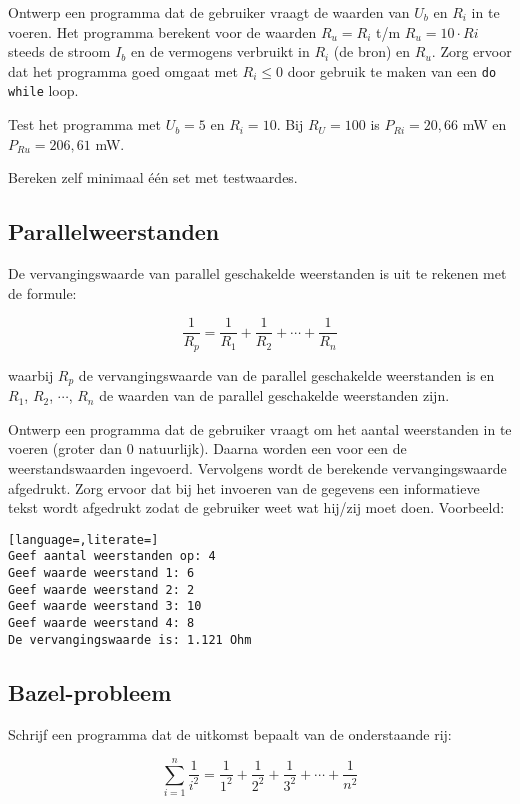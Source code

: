 \documentclass[a4paper,10pt,fleqn,twoside]{article}
\begin{document}
Ontwerp een programma dat de gebruiker vraagt de waarden van $U_b$ en $R_i$ in te voeren. Het programma berekent voor de waarden $R_u = R_i$ t/m $R_u = 10\cdot Ri$ steeds de stroom $I_b$ en de vermogens verbruikt in $R_i$ (de bron) en $R_u$. Zorg ervoor dat het programma goed omgaat met $R_i \leq 0$ door gebruik te maken van een \lstinline|do while| loop.

Test het programma met $U_b=5$ en $R_i=10$. Bij $R_U=100$ is $P_{Ri}=20,66$ mW en $P_{Ru}=206,61$ mW.

Bereken zelf minimaal één set met testwaardes.

\subsection{Parallelweerstanden}
De vervangingswaarde van parallel geschakelde weerstanden is uit te rekenen met de formule:

\begin{equation*}
\dfrac{1}{R_p} =\dfrac{1}{R_1} + \dfrac{1}{R_2} + \cdots + \dfrac{1}{R_n} 
\end{equation*}

waarbij $R_p$ de vervangingswaarde van de parallel geschakelde weerstanden is en $R_1$, $R_2$, $\cdots$, $R_n$ de waarden van de parallel geschakelde weerstanden zijn.

Ontwerp een programma dat de gebruiker vraagt om het aantal weerstanden in te voeren (groter dan 0 natuurlijk). Daarna worden een voor een de weerstandswaarden ingevoerd. Vervolgens wordt de berekende vervangingswaarde afgedrukt. Zorg ervoor dat bij het invoeren van de gegevens een informatieve tekst wordt afgedrukt zodat de gebruiker weet wat hij/zij moet doen. Voorbeeld:

\begin{lstlisting}[language=,literate=]
Geef aantal weerstanden op: 4
Geef waarde weerstand 1: 6
Geef waarde weerstand 2: 2
Geef waarde weerstand 3: 10
Geef waarde weerstand 4: 8
De vervangingswaarde is: 1.121 Ohm
\end{lstlisting}

\subsection{Bazel-probleem }
Schrijf een programma dat de uitkomst bepaalt van de onderstaande rij:

\begin{equation*}
\sum_{i=1}^n \dfrac{1}{i^2} = \dfrac{1}{1^2} + \dfrac{1}{2^2} + \dfrac{1}{3^2} + \cdots + \dfrac{1}{n^2}
\end{equation*}
\end{document}
